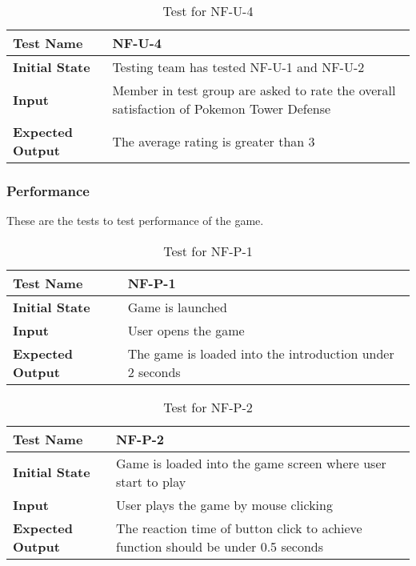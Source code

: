 \documentclass[12,english]{article}
\begin{document}
        \begin{table}[h!]
        	\begin{tabular}[r]{|l|l|}
        	    \hline
        		\textbf{Test Name} & NF-U-4 \\ 
        		\hline
        		\textbf{Initial State} & Testing team has tested NF-U-1 and NF-U-2\\ 
        		\hline
        		\textbf{Input} & Member in test group are asked to rate the overall satisfaction of Pokemon Tower Defense\\ 
        		\hline 
        		\textbf{Expected Output} & The average rating is greater than 3\\ 
        		\hline
        	\end{tabular}
        	\caption{Test for NF-U-4}
        	\label{Table}
        \end{table}

        \subsubsection{Performance}
        These are the tests to test performance of the game.
            \begin{table}[h!]
            \begin{tabular}[r]{|l|l|}
            \hline
            \textbf{Test Name} & NF-P-1 \\ 
            \hline
            \textbf{Initial State} & Game is launched\\ 
            \hline
            \textbf{Input} & User opens the game\\ 
            \hline 
            \textbf{Expected Output} & The game is loaded into the introduction under 2 seconds\\ 
            \hline
            \end{tabular}
            \caption{Test for NF-P-1}
            \label{Table}
            \end{table}
        
            \begin{table}[h!]
            	\begin{tabular}[r]{|l|l|}
            	    \hline
            		\textbf{Test Name} & NF-P-2 \\ 
            		\hline
            		\textbf{Initial State} & Game is loaded into the game screen where user start to play\\ 
            		\hline
            		\textbf{Input} & User plays the game by mouse clicking\\ 
            		\hline 
            		\textbf{Expected Output} & The reaction time of button click to achieve function should be under 0.5 seconds\\ 
            		\hline
            	\end{tabular}
            	\caption{Test for NF-P-2}
            	\label{Table}
            \end{table}
    \newpage
\end{document}

